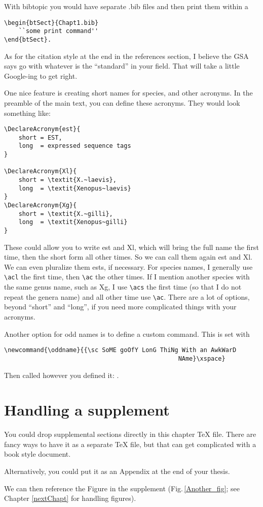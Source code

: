 With bibtopic you would have separate .bib files and then print them within a 
\begin{verbatim}
\begin{btSect}{Chapt1.bib}
	``some print command''
\end{btSect}.
\end{verbatim}

As for the citation style at the end in the references section, I believe the GSA says go with whatever is the ``standard'' in your field. That will take a little Google-ing to get right. 

\clearpage %

One nice feature is creating short names for species, and other acronyms. In the preamble of the main text, you can define these acronyms. They would look something like:
\begin{verbatim}
\DeclareAcronym{est}{
	short = EST,
	long  = expressed sequence tags
}

\DeclareAcronym{Xl}{
	short = \textit{X.~laevis},
	long  = \textit{Xenopus~laevis}
}
\DeclareAcronym{Xg}{
	short = \textit{X.~gilli},
	long  = \textit{Xenopus~gilli}
}
\end{verbatim}

These could allow you to write \ac{est} and \acl{Xl}, which will bring the full name the first time, then the short form all other times. So we can call them again \ac{est} and \ac{Xl}. We can even pluralize them \acp{est}, if necessary. For species names, I generally use \verb+\acl+ the first time, then \verb+\ac+ the other times. If I mention another species with the same genus name, such as \acs{Xg}, I use \verb+\acs+ the first time (so that I do not repeat the genera name) and all other time use \verb+\ac+. There are a lot of options, beyond ``short'' and ``long'', if you need more complicated things with your acronyms. 

Another option for odd names is to define a custom command. This is set with
\begin{verbatim}
\newcommand{\oddname}{{\sc SoME goOfY LonG ThiNg With an AwkWarD 
                                                NAme}\xspace}
\end{verbatim}

Then called however you defined it: \oddname.

\section{Handling a supplement}

You could drop supplemental sections directly in this chapter \TeX{} file. There are fancy ways to have it as a separate \TeX{} file, but that can get complicated with a book style document. 

Alternatively, you could put it as an Appendix at the end of your thesis. 

We can then reference the Figure in the supplement (Fig.\,\ref{Another_fig}; see Chapter \ref{nextChapt} for handling figures). 










